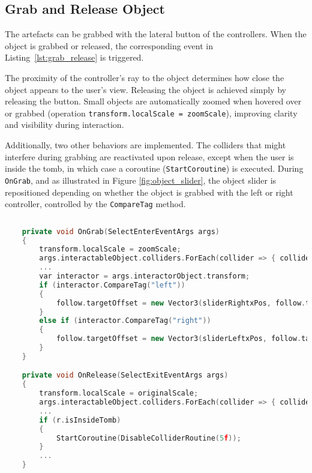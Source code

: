 \subsection*{Grab and Release Object}
\label{sec:object_interaction}

The artefacts can be grabbed with the lateral button of the controllers.
When the object is grabbed or released, the corresponding event in Listing~\ref{lst:grab_release} is triggered.  

The proximity of the controller's ray to the object determines how close the object appears to the user's view. 
Releasing the object is achieved simply by releasing the button.  
Small objects are automatically zoomed when hovered over or grabbed (operation \texttt{transform.localScale = zoomScale}), improving clarity and visibility during interaction.

Additionally, two other behaviors are implemented. 
The colliders that might interfere during grabbing are reactivated upon release, except when the user is inside the tomb, in which case a coroutine (\texttt{StartCoroutine}) is executed.
During \texttt{OnGrab}, and as illustrated in Figure \ref{fig:object_slider}, the object slider is repositioned depending on whether the object is grabbed with the left or right controller, controlled by the \texttt{CompareTag} method.

\begin{lstlisting}[language=C++, caption={Partial Fragment of objects onGrab and onRelease events.}, label={lst:grab_release}]
     
    private void OnGrab(SelectEnterEventArgs args)
    {
        transform.localScale = zoomScale;
        args.interactableObject.colliders.ForEach(collider => { collider.enabled = false; });
        ...
        var interactor = args.interactorObject.transform;
        if (interactor.CompareTag("left")) 
        {
            follow.targetOffset = new Vector3(sliderRightxPos, follow.targetOffset.y, follow.targetOffset.z);
        }
        else if (interactor.CompareTag("right")) 
        {
            follow.targetOffset = new Vector3(sliderLeftxPos, follow.targetOffset.y, follow.targetOffset.z);
        }
    }

    private void OnRelease(SelectExitEventArgs args)
    {
        transform.localScale = originalScale;
        args.interactableObject.colliders.ForEach(collider => { collider.enabled = true; });
        ...
        if (r.isInsideTomb)
        {
            StartCoroutine(DisableColliderRoutine(5f));
        }
        ...
    }
\end{lstlisting}


